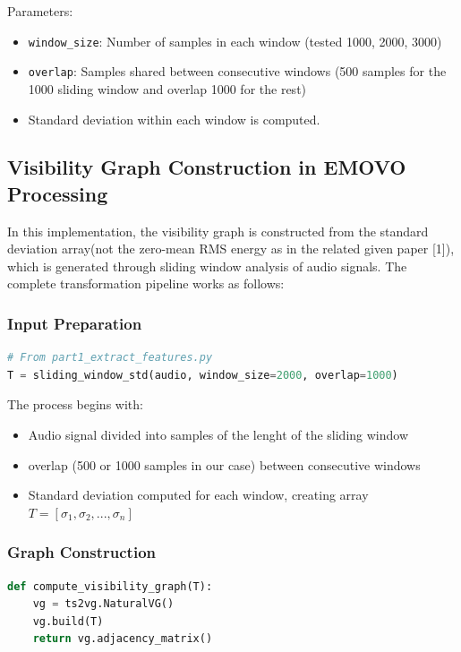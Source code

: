 \documentclass{article}
\begin{document}
Parameters:
\begin{itemize}
    \item \texttt{window\_size}: Number of samples in each window (tested 1000, 2000, 3000)
    \item \texttt{overlap}: Samples shared between consecutive windows (500 samples for the 1000 sliding window and overlap 1000 for the rest)
    \item Standard deviation within each window is computed.
\end{itemize}



\subsection{Visibility Graph Construction in EMOVO Processing}
In this implementation, the visibility graph is constructed from the standard deviation array(not the zero-mean RMS energy as in the related given paper [1]), 
which is generated through sliding window analysis of audio signals. 
The complete transformation pipeline works as follows:

\subsubsection{Input Preparation}
\begin{lstlisting}[language=Python]
# From part1_extract_features.py
T = sliding_window_std(audio, window_size=2000, overlap=1000)
\end{lstlisting}

The process begins with:
\begin{itemize}
    \item Audio signal divided into samples of the lenght of the sliding window
    \item overlap (500 or 1000 samples in our case) between consecutive windows
    \item Standard deviation computed for each window, creating array $T = [\sigma_1, \sigma_2, ..., \sigma_n]$
\end{itemize}

\subsubsection{Graph Construction}
\begin{lstlisting}[language=Python]
def compute_visibility_graph(T):
    vg = ts2vg.NaturalVG()
    vg.build(T)
    return vg.adjacency_matrix()
\end{lstlisting}
\end{document}

